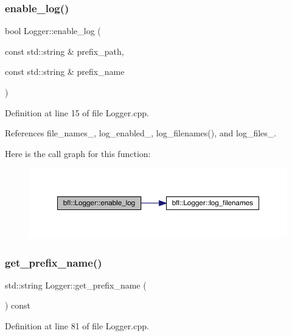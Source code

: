 \subsubsection{\texorpdfstring{enable\+\_\+log()}{enable\_log()}}
{\footnotesize\ttfamily bool Logger\+::enable\+\_\+log (\begin{DoxyParamCaption}\item[{const std\+::string \&}]{prefix\+\_\+path,  }\item[{const std\+::string \&}]{prefix\+\_\+name }\end{DoxyParamCaption})}



Definition at line 15 of file Logger.\+cpp.



References file\+\_\+names\+\_\+, log\+\_\+enabled\+\_\+, log\+\_\+filenames(), and log\+\_\+files\+\_\+.

Here is the call graph for this function\+:
\nopagebreak
\begin{figure}[H]
\begin{center}
\leavevmode
\includegraphics[width=350pt]{classbfl_1_1Logger_ae94b97b6e8d7902e8ce048384813122e_cgraph}
\end{center}
\end{figure}
\mbox{\label{classbfl_1_1Logger_a913a795b7bfbf378815eeb342d68a7c0}} 
\subsubsection{\texorpdfstring{get\+\_\+prefix\+\_\+name()}{get\_prefix\_name()}}
{\footnotesize\ttfamily std\+::string Logger\+::get\+\_\+prefix\+\_\+name (\begin{DoxyParamCaption}{ }\end{DoxyParamCaption}) const}



Definition at line 81 of file Logger.\+cpp.



